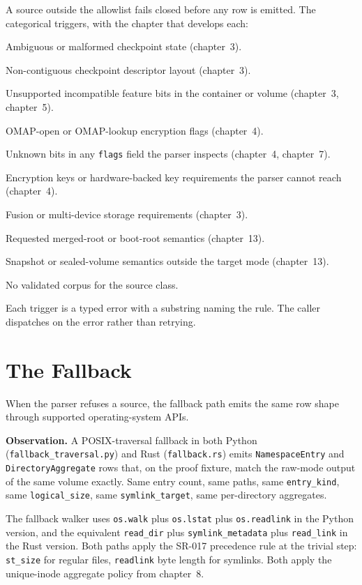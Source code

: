 A source outside the allowlist fails closed before any row is
emitted. The categorical triggers, with the chapter that develops
each:

\begin{description}
  \item Ambiguous or malformed checkpoint state (chapter~3).
  \item Non-contiguous checkpoint descriptor layout (chapter~3).
  \item Unsupported incompatible feature bits in the container or
    volume (chapter~3, chapter~5).
  \item OMAP-open or OMAP-lookup encryption flags (chapter~4).
  \item Unknown bits in any \texttt{flags} field the parser inspects
    (chapter~4, chapter~7).
  \item Encryption keys or hardware-backed key requirements the
    parser cannot reach (chapter~4).
  \item Fusion or multi-device storage requirements (chapter~3).
  \item Requested merged-root or boot-root semantics (chapter~13).
  \item Snapshot or sealed-volume semantics outside the target mode
    (chapter~13).
  \item No validated corpus for the source class.
\end{description}

Each trigger is a typed error with a substring naming the rule.
The caller dispatches on the error rather than retrying.

\section{The Fallback}

When the parser refuses a source, the fallback path emits the
same row shape through supported operating-system APIs.

\textbf{Observation.} A POSIX-traversal fallback in both Python
(\texttt{fallback\_traversal.py}) and Rust (\texttt{fallback.rs})
emits \texttt{NamespaceEntry} and \texttt{DirectoryAggregate} rows
that, on the proof fixture, match the raw-mode output of the same
volume exactly. Same entry count, same paths, same
\texttt{entry\_kind}, same \texttt{logical\_size}, same
\texttt{symlink\_target}, same per-directory aggregates.

The fallback walker uses \texttt{os.walk} plus \texttt{os.lstat} plus
\texttt{os.readlink} in the Python version, and the equivalent
\texttt{read\_dir} plus \texttt{symlink\_metadata} plus
\texttt{read\_link} in the Rust version. Both paths apply the SR-017
precedence rule at the trivial step: \texttt{st\_size} for regular
files, \texttt{readlink} byte length for symlinks. Both apply the
unique-inode aggregate policy from chapter~8.

